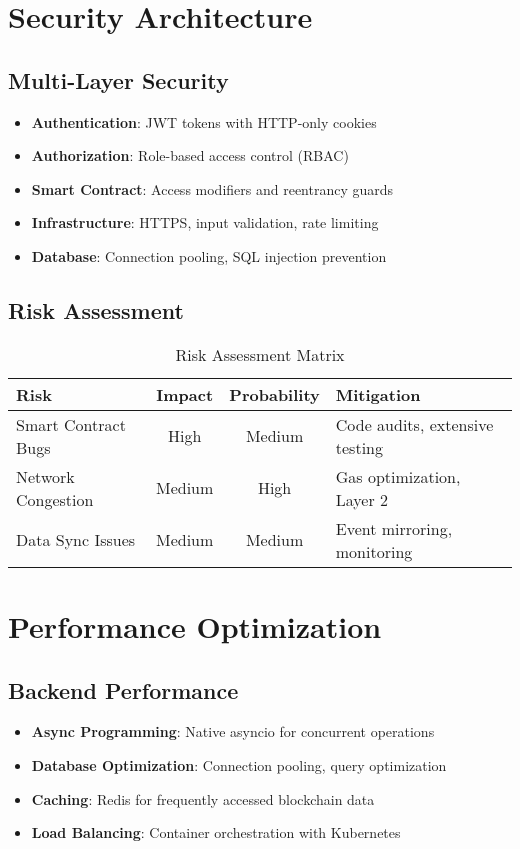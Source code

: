\documentclass[11pt,a4paper]{article}
\begin{document}
\section{Security Architecture}

\subsection{Multi-Layer Security}
\begin{itemize}
    \item \textbf{Authentication}: JWT tokens with HTTP-only cookies
    \item \textbf{Authorization}: Role-based access control (RBAC)
    \item \textbf{Smart Contract}: Access modifiers and reentrancy guards
    \item \textbf{Infrastructure}: HTTPS, input validation, rate limiting
    \item \textbf{Database}: Connection pooling, SQL injection prevention
\end{itemize}

\subsection{Risk Assessment}
\begin{table}[H]
\centering
\begin{tabular}{|l|c|c|p{4cm}|}
\hline
\textbf{Risk} & \textbf{Impact} & \textbf{Probability} & \textbf{Mitigation} \\
\hline
Smart Contract Bugs & High & Medium & Code audits, extensive testing \\
Network Congestion & Medium & High & Gas optimization, Layer 2 \\
Data Sync Issues & Medium & Medium & Event mirroring, monitoring \\
\hline
\end{tabular}
\caption{Risk Assessment Matrix}
\end{table}

\section{Performance Optimization}

\subsection{Backend Performance}
\begin{itemize}
    \item \textbf{Async Programming}: Native asyncio for concurrent operations
    \item \textbf{Database Optimization}: Connection pooling, query optimization
    \item \textbf{Caching}: Redis for frequently accessed blockchain data
    \item \textbf{Load Balancing}: Container orchestration with Kubernetes
\end{itemize}
\end{document}
